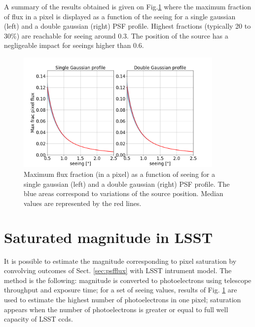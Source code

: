 \documentclass[\docopts]{\docclass}
\begin{document}
A summary of the results obtained is given on Fig.\ref{fig:fracseeing} where the maximum fraction of flux in a pixel is displayed as a function of the seeing for a single gaussian (left) and a double gaussian (right) PSF profile. Highest fractions (typically 20 to 30\%) are reachable for seeing around 0.3\arcsec. The position of the source has a negligeable impact for seeings higher than 0.6\arcsec.
\begin{figure}[htbp]
\begin{center}
  \includegraphics[width=0.9\textwidth]{max_frac_seeing.png}
 \caption{Maximum flux fraction (in a pixel) as a function of seeing for a single gaussian (left) and a double gaussian (right) PSF profile. The blue areas correspond to variations of the source position. Median values are represented by the red lines.}\label{fig:fracseeing}
\end{center}
\end{figure}


\section{Saturated magnitude in LSST}
\label{sec:magsaturation}

It is possible to estimate the magnitude corresponding to pixel saturation by convolving  outcomes of Sect. \ref{sec:psfflux} with LSST intrument model. The method is the following:  magnitude is converted to photoelectrons using telescope throughput and exposure time; for a set of seeing values, results of Fig. \ref{fig:fracseeing} are used to estimate the highest number of photoelectrons in one pixel; saturation appears when the number of photoelectrons is greater or equal to full well capacity of LSST ccds. 
\end{document}
